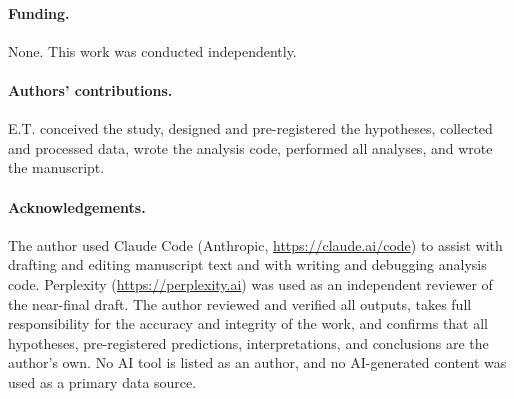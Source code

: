 \documentclass[11pt]{article}
\begin{document}
\paragraph{Funding.}
None. This work was conducted independently.

\paragraph{Authors' contributions.}
E.T. conceived the study, designed and pre-registered the hypotheses, collected and processed data, wrote the analysis code, performed all analyses, and wrote the manuscript.

\paragraph{Acknowledgements.}
The author used Claude Code (Anthropic, \url{https://claude.ai/code}) to assist with drafting and editing manuscript text and with writing and debugging analysis code. Perplexity (\url{https://perplexity.ai}) was used as an independent reviewer of the near-final draft. The author reviewed and verified all outputs, takes full responsibility for the accuracy and integrity of the work, and confirms that all hypotheses, pre-registered predictions, interpretations, and conclusions are the author's own. No AI tool is listed as an author, and no AI-generated content was used as a primary data source.
\end{document}
